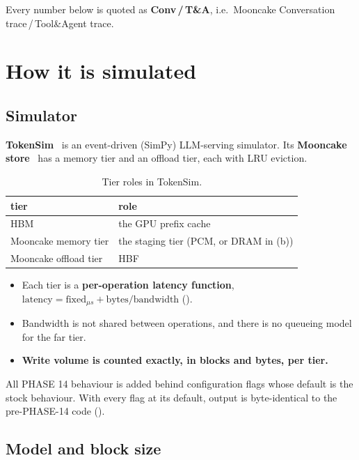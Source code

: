 \documentclass[11pt,a4paper]{article}
\newcommand{\hd}[1]{\textbf{#1}}
\newcommand{\CT}{Conv\,/\,T\&A}
\begin{document}
Every number below is quoted as \textbf{\CT}, i.e.\ Mooncake Conversation
trace\,/\,Tool\&Agent trace.

\section{How it is simulated}\label{sec:sim}

\subsection{Simulator}

\textbf{TokenSim}~\cite{tokensim} is an event-driven (SimPy) LLM-serving
simulator. Its \textbf{Mooncake store}~\cite{mooncake} has a memory tier and
an offload tier, each with LRU eviction.

\begin{xltabular}{\linewidth}{@{}P{45mm} L@{}}
\caption{Tier roles in TokenSim.}\label{tab:roles}\\
\toprule
\hd{tier} & \hd{role} \\
\midrule
HBM & the GPU prefix cache \\
Mooncake memory tier & the staging tier (PCM, or DRAM in (b)) \\
Mooncake offload tier & HBF \\
\bottomrule
\end{xltabular}

\begin{itemize}
  \item Each tier is a \textbf{per-operation latency function},
    $\text{latency} = \text{fixed}_{\mu s} + \text{bytes} / \text{bandwidth}$
    ().
  \item Bandwidth is not shared between operations, and there is no queueing
    model for the far tier.
  \item \textbf{Write volume is counted exactly, in blocks and bytes, per
    tier.}
\end{itemize}

All PHASE 14 behaviour is added behind configuration flags whose default is
the stock behaviour. With every flag at its default, output is byte-identical
to the pre-PHASE-14 code ().

\subsection{Model and block size}
\end{document}
